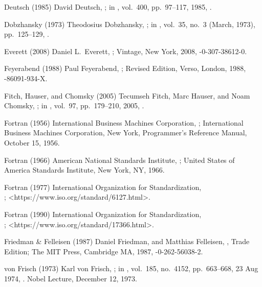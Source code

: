 \biblabel Deutsch (1985)
David Deutsch,
;
in ,
 vol.\ 400, pp.\ 97--117, 1985,
.

\biblabel Dobzhansky (1973)
Theodosius Dobzhansky,
;
in ,
 vol.\ 35, no.\ 3 (March, 1973), pp.\ 125--129,
.

\biblabel Everett (2008)
Daniel L.\ Everett,
;
Vintage, New York, 2008,
-0-307-38612-0.

\biblabel Feyerabend (1988)
Paul Feyerabend,
;
Revised Edition, Verso, London, 1988,
-86091-934-X.

\biblabel  Fitch, Hauser, and Chomsky (2005)
Tecumseh Fitch, Marc Hauser, and Noam Chomsky,
;
in ,
vol.\ 97, pp.\ 179--210, 2005,
.

\biblabel Fortran (1956)
International Business Machines Corporation,
;
International Business Machines Corporation, New York,
Programmer's Reference Manual, October 15, 1956.

\biblabel Fortran (1966)
American National Standards Institute,
;
United States of America Standards Institute, New York, NY, 1966.

\biblabel Fortran (1977)
International Organization for Standardization,\\
;
\URL<https://www.iso.org/standard/6127.html>.

\biblabel Fortran (1990)
International Organization for Standardization,\\
;
\URL<https://www.iso.org/standard/17366.html>.

\biblabel Friedman \& Felleisen (1987)
Daniel Friedman, and Matthias Felleisen,
, Trade Edition;
The MIT Press, Cambridge MA, 1987,
-0-262-56038-2.

\biblabel von Frisch (1973)
Karl von Frisch,
;
in ,
vol.\ 185, no.\ 4152, pp.\ 663--668, 23 Aug 1974,
.
Nobel Lecture, December 12, 1973.

